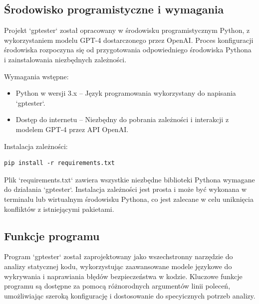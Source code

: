 \subsection{Środowisko programistyczne i wymagania}
\label{sec:srodowisko_i_wymagania}

Projekt `gptester` został opracowany w środowisku programistycznym Python, z wykorzystaniem modelu GPT-4 dostarczonego przez OpenAI. Proces konfiguracji środowiska rozpoczyna się od przygotowania odpowiedniego środowiska Pythona i zainstalowania niezbędnych zależności.

Wymagania wstępne:
\begin{itemize}
    \item Python w wersji 3.x – Język programowania wykorzystany do napisania `gptester`.
    \item Dostęp do internetu – Niezbędny do pobrania zależności i interakcji z modelem GPT-4 przez API OpenAI.
\end{itemize}

Instalacja zależności:
\begin{listing}
    \begin{verbatim}
pip install -r requirements.txt
\end{verbatim}
\end{listing}

Plik `requirements.txt` zawiera wszystkie niezbędne biblioteki Pythona wymagane do działania `gptester`. Instalacja zależności jest prosta i może być wykonana w terminalu lub wirtualnym środowisku Pythona, co jest zalecane w celu uniknięcia konfliktów z istniejącymi pakietami.



\subsection{Funkcje programu}
\label{sec:funkcje_programu}

Program `gptester` został zaprojektowany jako wszechstronny narzędzie do analizy statycznej kodu, wykorzystując zaawansowane modele językowe do wykrywania i naprawiania błędów bezpieczeństwa w kodzie. Kluczowe funkcje programu są dostępne za pomocą różnorodnych argumentów linii poleceń, umożliwiając szeroką konfigurację i dostosowanie do specyicznych potrzeb analizy.

